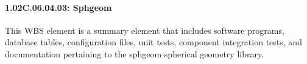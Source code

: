 \paragraph*{1.02C.06.04.03: Sphgeom}

This WBS element is a summary element that includes software programs, database tables, configuration files, unit tests, component integration tests, and documentation pertaining to the sphgeom spherical geometry library.
